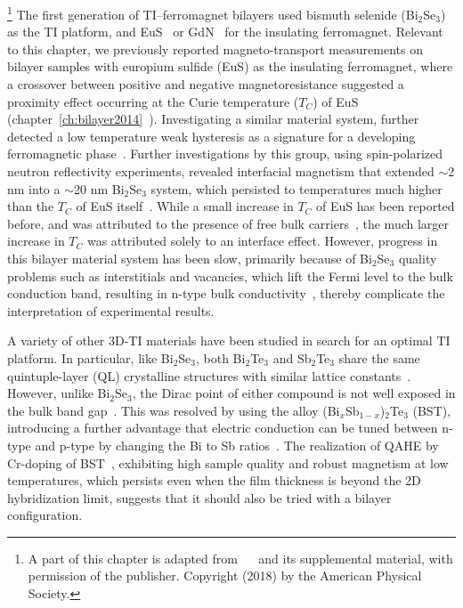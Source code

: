 \footnote[2]{A part of this chapter is adapted from ~\cite{bilayer2018}~ and its supplemental material, with permission of the publisher. Copyright (2018) by the American Physical Society.}%
%
The first generation of TI--ferromagnet bilayers used bismuth selenide (Bi$_2$Se$_3$) as the TI platform, and EuS~\cite{bilayer2014,Moodera2013} or GdN~\cite{Samarth2013} for the insulating ferromagnet. Relevant to this chapter, we previously reported magneto-transport measurements on bilayer samples with europium sulfide (EuS) as the insulating ferromagnet, where a crossover between positive and negative magnetoresistance suggested a proximity effect occurring at the Curie temperature ($T_C$) of EuS (chapter~\ref{ch:bilayer2014}~\cite{bilayer2014}). Investigating a similar material system, \citeauthor{Moodera2013} further detected a low temperature weak hysteresis as a signature for a developing ferromagnetic phase~\cite{Moodera2013}. Further investigations by this group, using spin-polarized neutron reflectivity experiments, revealed interfacial magnetism that extended $\sim$2 nm into a $\sim$20 nm Bi$_2$Se$_3$ system, which persisted to temperatures much higher than the $T_C$ of EuS itself~\cite{Moodera2016}. While a small increase in $T_C$ of EuS has been reported before, and was attributed to the presence of free bulk carriers~\cite{EuS_ntype, EuS_thin_film_Keller}, the much larger increase in $T_C$ was attributed solely to an interface effect. However, progress in this bilayer material system has been slow, primarily because of Bi$_2$Se$_3$ quality problems such as interstitials and vacancies, which lift the Fermi level to the bulk conduction band, resulting in n-type bulk conductivity~\cite{TI_ARPES1, zhangli2013, Zhanybek3, Fisher2010}, thereby complicate the interpretation of experimental results.

A variety of other 3D-TI materials have been studied in search for an optimal TI platform. In particular, like Bi$_2$Se$_3$, both Bi$_2$Te$_3$ and Sb$_2$Te$_3$ share the same quintuple-layer (QL) crystalline structures with similar lattice constants~\cite{SbStructure, BiStructure}. However, unlike Bi$_2$Se$_3$, the Dirac point of either compound is not well exposed in the bulk band gap~\cite{TI_electronic_structure_zhang}. This was resolved by using the alloy (Bi$_x$Sb$_{1-x}$)$_2$Te$_3$ (BST), introducing a further advantage that electric conduction can be tuned between n-type and p-type by changing the Bi to Sb ratios~\cite{ZhangJS2011}. The realization of QAHE by Cr-doping of BST~\cite{Chang2013, Kou2014}, exhibiting high sample quality and robust magnetism at low temperatures, which persists even when the film thickness is beyond the 2D hybridization limit, suggests that it should also be tried with a bilayer configuration.

